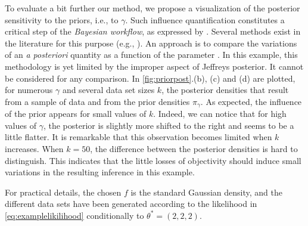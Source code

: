 To evaluate a bit further our method, we propose a visualization of the posterior sensitivity to the priors, i.e., to $\gamma$. 
Such influence quantification constitutes a critical step of the \emph{Bayesian workflow}, as expressed by   \citet{gelman_bayesian_2020}. Several methods exist  in the literature for this purpose (e.g., \cite{berger_robust_1990,nott_checking_2020}). 
An approach is to compare the variations of an \emph{a posteriori} quantity as a function of the parameter \citep{kallioinen_detecting_2023}. In this example, this methodology is yet limited by the improper aspect of Jeffreys posterior. It cannot be considered for any comparison.
In \cref{fig:priorpost}.(b), (c) and (d) are plotted, for numerous $\gamma$ and several data set sizes $k$, the posterior densities that result from a sample of data and from the prior densities $\pi_\gamma$.
As expected, the influence of the prior appears for small values of $k$.
Indeed, we can notice that for high values of $\gamma$, the posterior is slightly more shifted to the right and seems to be a little flatter. 
It is remarkable that this observation becomes limited when $k$ increases. When $k=50$, the difference between the posterior densities 
is hard to distinguish. %
This indicates that the little losses of objectivity should induce small variations in the resulting inference in this example.

For practical details, the chosen $f$ is the standard Gaussian density, and the different data sets have been generated according to the likelihood in \cref{eq:examplelikilihood} conditionally to $\theta^\ast=(2,2,2)$. %








